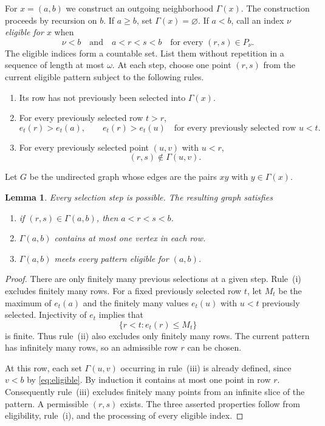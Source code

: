 \documentclass[10pt,letterpaper,leqno]{amsart}
\numberwithin{equation}{section}
\newtheorem{lemma}[theorem]{Lemma}
\theoremstyle{definition}
\theoremstyle{remark}
\newcommand{\Gam}{\Gamma}
\begin{document}
For $x=(a,b)$ we construct an outgoing neighborhood $\Gam(x)$.
The construction proceeds by recursion on $b$.
If $a\ge b$, set $\Gam(x)=\varnothing$.
If $a<b$, call an index $\nu$ \emph{eligible for $x$} when
\begin{equation}\label{eq:eligible}
 \nu<b
 \quad\text{and}\quad
 a<r<s<b\quad\text{for every }(r,s)\in P_\nu.
\end{equation}
The eligible indices form a countable set. List them without repetition
in a sequence of length at most $\omega$.
At each step, choose one point $(r,s)$ from the current eligible pattern
subject to the following rules.
\begin{enumerate}[label=\textup{(\roman*)},leftmargin=2.3em]
\item Its row has not previously been selected into $\Gam(x)$.
\item For every previously selected row $t>r$,
\begin{equation}\label{eq:selection-rank}
 e_t(r)>e_t(a),
 \qquad
 e_t(r)>e_t(u)
 \quad\text{for every previously selected row }u<t.
\end{equation}
\item For every previously selected point $(u,v)$ with $u<r$,
\begin{equation}\label{eq:selection-avoid}
 (r,s)\notin\Gam(u,v).
\end{equation}
\end{enumerate}
Let $G$ be the undirected graph whose edges are the pairs $xy$ with
$y\in\Gam(x)$.

\begin{lemma}\label{lem:construction}
Every selection step is possible. The resulting graph satisfies
\begin{enumerate}[label=\textup{(\roman*)},leftmargin=2.3em]
\item if $(r,s)\in\Gam(a,b)$, then $a<r<s<b$.
\item $\Gam(a,b)$ contains at most one vertex in each row.
\item $\Gam(a,b)$ meets every pattern eligible for $(a,b)$.
\end{enumerate}
\end{lemma}

\begin{proof}
There are only finitely many previous selections at a given step.
Rule~\textup{(i)} excludes finitely many rows.
For a fixed previously selected row $t$, let $M_t$ be the maximum of
$e_t(a)$ and the finitely many values $e_t(u)$ with $u<t$ previously
selected. Injectivity of $e_t$ implies that
\[
 \{r<t:e_t(r)\le M_t\}
\]
is finite. Thus rule~\textup{(ii)} also excludes only finitely many rows.
The current pattern has infinitely many rows, so an admissible row $r$
can be chosen.

At this row, each set $\Gam(u,v)$ occurring in
rule~\textup{(iii)} is already defined, since $v<b$ by
\eqref{eq:eligible}. By induction it contains at most one point in
row $r$. Consequently rule~\textup{(iii)} excludes finitely many points
from an infinite slice of the pattern. A permissible $(r,s)$ exists.
The three asserted properties follow from eligibility, rule~\textup{(i)},
and the processing of every eligible index.
\end{proof}
\end{document}
